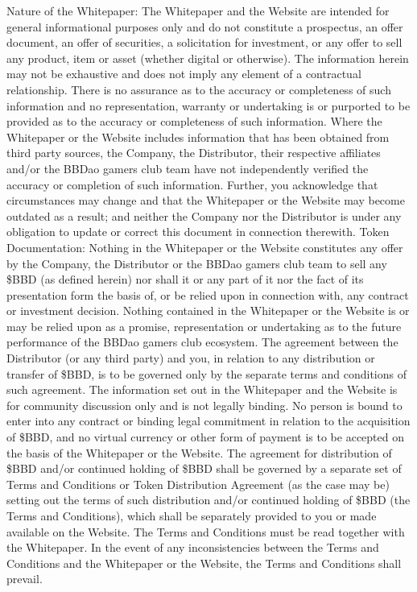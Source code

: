 \documentclass[
]{book}
\begin{document}
Nature of the Whitepaper: The Whitepaper and the Website are intended for general informational purposes only and do not constitute a prospectus, an offer document, an offer of securities, a solicitation for investment, or any offer to sell any product, item or asset (whether digital or otherwise). The information herein may not be exhaustive and does not imply any element of a contractual relationship. There is no assurance as to the accuracy or completeness of such information and no representation, warranty or undertaking is or purported to be provided as to the accuracy or completeness of such information. Where the Whitepaper or the Website includes information that has been obtained from third party sources, the Company, the Distributor, their respective affiliates and/or the BBDao gamers club team have not independently verified the accuracy or completion of such information. Further, you acknowledge that circumstances may change and that the Whitepaper or the Website may become outdated as a result; and neither the Company nor the Distributor is under any obligation to update or correct this document in connection therewith.
Token Documentation: Nothing in the Whitepaper or the Website constitutes any offer by the Company, the Distributor or the BBDao gamers club team to sell any \$BBD (as defined herein) nor shall it or any part of it nor the fact of its presentation form the basis of, or be relied upon in connection with, any contract or investment decision. Nothing contained in the Whitepaper or the Website is or may be relied upon as a promise, representation or undertaking as to the future performance of the BBDao gamers club ecosystem. The agreement between the Distributor (or any third party) and you, in relation to any distribution or transfer of \$BBD, is to be governed only by the separate terms and conditions of such agreement.
The information set out in the Whitepaper and the Website is for community discussion only and is not legally binding. No person is bound to enter into any contract or binding legal commitment in relation to the acquisition of \$BBD, and no virtual currency or other form of payment is to be accepted on the basis of the Whitepaper or the Website. The agreement for distribution of \$BBD and/or continued holding of \$BBD shall be governed by a separate set of Terms and Conditions or Token Distribution Agreement (as the case may be) setting out the terms of such distribution and/or continued holding of \$BBD (the Terms and Conditions), which shall be separately provided to you or made available on the Website. The Terms and Conditions must be read together with the Whitepaper. In the event of any inconsistencies between the Terms and Conditions and the Whitepaper or the Website, the Terms and Conditions shall prevail.
\end{document}
